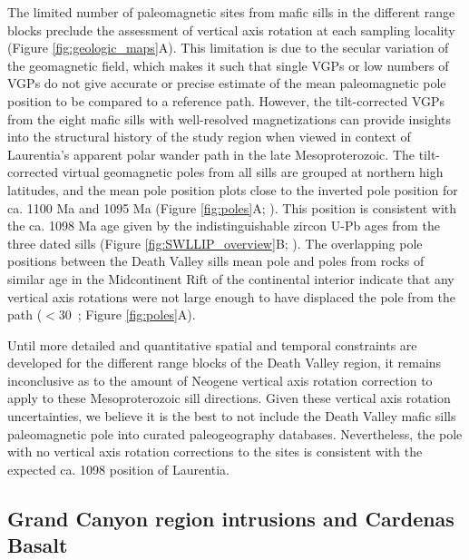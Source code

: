 The limited number of paleomagnetic sites from mafic sills in the different range blocks preclude the assessment of vertical axis rotation at each sampling locality (Figure \ref{fig:geologic_maps}A). This limitation is due to the secular variation of the geomagnetic field, which makes it such that single VGPs or low numbers of VGPs do not give accurate or precise estimate of the mean paleomagnetic pole position to be compared to a reference path. However, the tilt-corrected VGPs from the eight mafic sills with well-resolved magnetizations can provide insights into the structural history of the study region when viewed in context of Laurentia's apparent polar wander path in the late Mesoproterozoic. The tilt-corrected virtual geomagnetic poles from all sills are grouped at northern high latitudes, and the mean pole position plots close to the inverted pole position for ca. 1100 Ma and 1095 Ma (Figure \ref{fig:poles}A; \citealp{Swanson-Hysell2019a}). This position is consistent with the ca. 1098 Ma age given by the indistinguishable zircon U-Pb ages from the three dated sills (Figure \ref{fig:SWLLIP_overview}B; \citealp{Mohr2024a}). The overlapping pole positions between the Death Valley sills mean pole and poles from rocks of similar age in the Midcontinent Rift of the continental interior indicate that any vertical axis rotations were not large enough to have displaced the pole from the path ($<$30\textdegree\ ; Figure \ref{fig:poles}A).

Until more detailed and quantitative spatial and temporal constraints are developed for the different range blocks of the Death Valley region, it remains inconclusive as to the amount of Neogene vertical axis rotation correction to apply to these Mesoproterozoic sill directions. Given these vertical axis rotation uncertainties, we believe it is the best to not include the Death Valley mafic sills paleomagnetic pole into curated paleogeography databases. Nevertheless, the pole with no vertical axis rotation corrections to the sites is consistent with the expected ca. 1098 position of Laurentia.

\subsection{Grand Canyon region intrusions and Cardenas Basalt}

